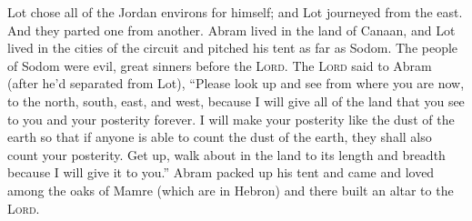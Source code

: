 \begin{inparaenum}
   Lot chose all of the Jordan environs for himself; and Lot journeyed from the east. And they parted one from another.%
   Abram lived in the land of Canaan, and Lot lived in the cities of the circuit and pitched his tent as far as Sodom.%
   The people of Sodom were evil, great sinners before the \textsc{Lord}.%
   The \textsc{Lord} said to Abram (after he'd separated from Lot), ``Please look up and see from where you are now, to the north, south, east, and west,%
   because I will give all of the land that you see to you and your posterity forever.%
   I will make your posterity like the dust of the earth so that if anyone is able to count the dust of the earth, they shall also count your posterity.%
   Get up, walk about in the land to its length and breadth because I will give it to you.''%
   Abram packed up his tent and came and loved among the oaks of Mamre (which are in Hebron) and there built an altar to the \textsc{Lord}.%
\end{inparaenum}
